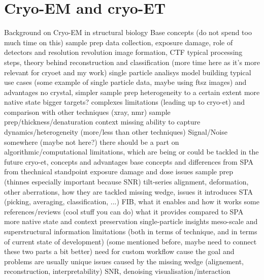 \chapter{Cryo-EM and cryo-ET}

\begin{outline}
\1 Background on Cryo-EM in structural biology
    \2 Base concepts (do not spend too much time on this)
        \3 sample prep
        \3 data collection, exposure damage, role of detectors and resolution revolution \cite{faruqiCCDDetectorsHighresolution2000}
        \3 image formation, CTF
        \3 typical processing steps, theory behind reconstruction and classification (more time here as it's more relevant for cryoet and my work)
        \3 single particle analisys
        \3 model building
    \2 typical use cases (some example of single particle data, maybe using ftsz images) and advantages
        \3 no crystal, simpler sample prep
        \3 heterogeneity to a certain extent
        \3 more native state
        \3 bigger targets? complexes
    \2 limitations (leading up to cryo-et) and comparison with other techniques (xray, nmr)
        \3 sample prep/thickness/denaturation
        \3 context missing
        \3 ability to capture dynamics/heterogeneity (more/less than other techniques)
        \3 Signal/Noise
        \3 somewhere (maybe not here?) there should be a part on algorithmic/computational limitations, which are being or could be tackled in the future
\1 cryo-et, concepts and advantages
    \2 base concepts and differences from SPA from thechnical standpoint
        \3 exposure damage and dose issues
        \3 sample prep (thinnes especially important because SNR)
        \3 tilt-series alignment, deformation, other aberrations, how they are tackled
        \3 missing wedge, issues it introduces
        \3 STA (picking, averaging, classification, ...)
        \3 FIB, what it enables and how it works
    \2 some references/reviews (cool stuff you can do)
        \3 \cite{turkPromiseChallengesCryoelectron2020,lucicCryoelectronTomographyChallenge2013}
    \2 what it provides compared to SPA
        \3 more native state and context preservation
        \3 single-particle insights
        \3 meso-scale and superstructural information
    \2 limitations (both in terms of technique, and in terms of current state of development)
        \3 (some mentioned before, maybe need to connect these two parts a bit better)
        \3 need for custom workflow cause the goal and problems are usually unique
        \3 issues caused by the missing wedge (alignement, reconstruction, interpretability)
        \3 SNR, denoising
        \3 visualisation/interaction
\end{outline}
